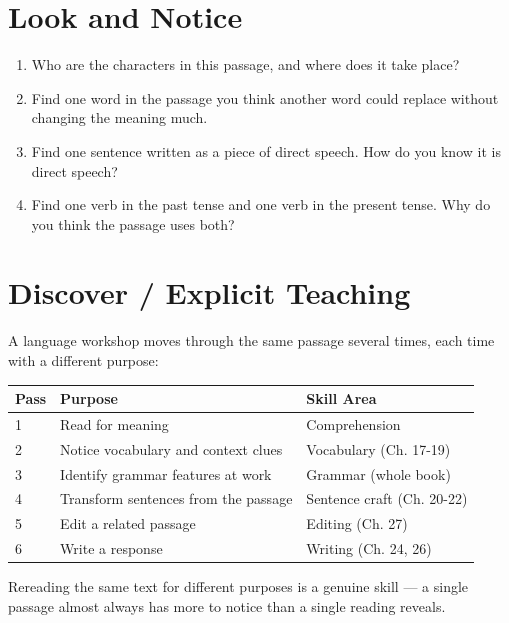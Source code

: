 \section{Look and Notice}
\begin{thinkbox}
\begin{enumerate}
    \item Who are the characters in this passage, and where does it take place?
    \item Find one word in the passage you think another word could replace without changing the meaning much.
    \item Find one sentence written as a piece of direct speech. How do you know it is direct speech?
    \item Find one verb in the past tense and one verb in the present tense. Why do you think the passage uses both?
\end{enumerate}
\end{thinkbox}

\section{Discover / Explicit Teaching}
A language workshop moves through the same passage several times, each time with a different purpose:

\begin{table}[h!]
\centering
\begin{tabular}{|l|p{5cm}|p{4cm}|}
\hline
\textbf{Pass} & \textbf{Purpose} & \textbf{Skill Area} \\
\hline
1 & Read for meaning & Comprehension \\
2 & Notice vocabulary and context clues & Vocabulary (Ch. 17-19) \\
3 & Identify grammar features at work & Grammar (whole book) \\
4 & Transform sentences from the passage & Sentence craft (Ch. 20-22) \\
5 & Edit a related passage & Editing (Ch. 27) \\
6 & Write a response & Writing (Ch. 24, 26) \\
\hline
\end{tabular}
\end{table}

Rereading the same text for different purposes is a genuine skill — a single passage almost always has more to notice than a single reading reveals.

